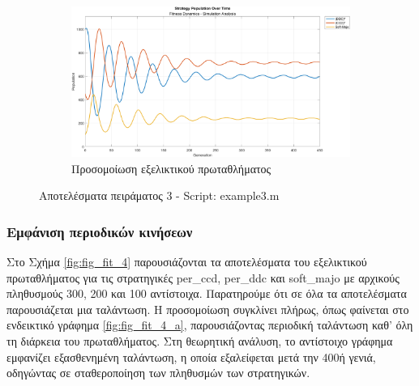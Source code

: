 \documentclass[12pt]{report}
\begin{document}
\begin{figure}[htbp]
    \hfill
    \begin{subfigure}[b]{0.5\linewidth}
        \centering
        \includegraphics[width=\linewidth]{Figures Fitness Dynamics/example3-sim.png}
        \caption{Προσομοίωση εξελικτικού πρωταθλήματος}
        \label{fig:fig_fit_3_c}
    \end{subfigure}

    \caption{Αποτελέσματα πειράματος 3 - \foreignlanguage{english}{Script: example3.m}}
    \label{fig:fig_fit_3}
\end{figure}


\subsubsection{Εμφάνιση περιοδικών κινήσεων}
Στο Σχήμα \ref{fig:fig_fit_4} παρουσιάζονται τα αποτελέσματα του εξελικτικού πρωταθλήματος για τις στρατηγικές \foreignlanguage{english}{per\_ccd, per\_ddc} και \foreignlanguage{english}{soft\_majo} με αρχικούς πληθυσμούς 300, 200 και 100 αντίστοιχα. Παρατηρούμε ότι σε όλα τα αποτελέσματα παρουσιάζεται μια ταλάντωση. Η προσομοίωση συγκλίνει πλήρως, όπως φαίνεται στο ενδεικτικό γράφημα \ref{fig:fig_fit_4_a}, παρουσιάζοντας περιοδική ταλάντωση καθ’ όλη τη διάρκεια του πρωταθλήματος. Στη θεωρητική ανάλυση, το αντίστοιχο γράφημα εμφανίζει εξασθενημένη ταλάντωση, η οποία εξαλείφεται μετά την 400ή γενιά, οδηγώντας σε σταθεροποίηση των πληθυσμών των στρατηγικών.
\end{document}
